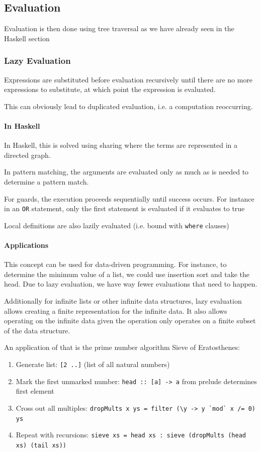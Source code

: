 \newpage
\subsection{Evaluation}
Evaluation is then done using tree traversal as we have already seen in the Haskell section


\subsubsection{Lazy Evaluation}
Expressions are substituted before evaluation recursively until there are no more expressions to substitute, at which point the expression is evaluated.

This can obviously lead to duplicated evaluation, i.e. a computation reoccurring.


\paragraph{In Haskell}
In Haskell, this is solved using sharing where the terms are represented in a directed graph.

In pattern matching, the arguments are evaluated only as much as is needed to determine a pattern match.

For guards, the execution proceeds sequentially until success occurs.
For instance in an \texttt{OR} statement, only the first statement is evaluated if it evaluates to true

Local definitions are also lazily evaluated (i.e. bound with \texttt{where} clauses)


\paragraph{Applications}
This concept can be used for data-driven programming.
For instance, to determine the minimum value of a list, we could use insertion sort and take the head.
Due to lazy evaluation, we have way fewer evaluations that need to happen.

Additionally for infinite lists or other infinite data structures, lazy evaluation allows creating a finite representation for the infinite data.
It also allows operating on the infinite data given the operation only operates on a finite subset of the data structure.

An application of that is the prime number algorithm Sieve of Eratosthenes:
\begin{enumerate}
    \item Generate list: \texttt{[2 ..]} (list of all natural numbers)
    \item Mark the first unmarked number: \texttt{head :: [a] -> a} from prelude determines first element
    \item Cross out all multiples: \verb|dropMults x ys = filter (\y -> y `mod` x /= 0) ys|
    \item Repeat with recursions: \texttt{sieve xs = head xs : sieve (dropMults (head xs) (tail xs))}
\end{enumerate}

